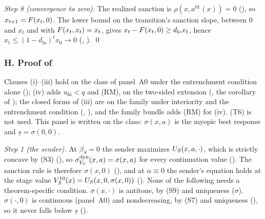 \emph{Step 8 (convergence to zero).} The realized sanction is $\rho(x,a^{01}(x))=0$
(), so $x_{t+1}=F(x_t,0)$. The lower bound on the
transition's sanction slope, between $0$ and $x_t$ and with $F(x_t,x_t)=x_t$, gives
$x_t-F(x_t,0)\ge d_{\mathrm{lo}}x_t$, hence $x_t\le(1-d_{\mathrm{lo}})^tx_0\to0$
(, ). \qed

\subsubsection*{H. Proof of }

Clauses (i)--(iii) hold on the class of panel~A0 under the entrenchment condition alone
(); (iv) adds $u_{\mathrm{hi}}<q$ and
(RM), on the two-sided extension (, the
corollary of ); the
closed forms of (iii) are on the family under interiority and the entrenchment condition
(,
), and the family bundle
 adds (RM) for (iv). (T6) is not used. This panel is written
on the class: $\sigma(x,a)$ is the myopic best response and $\underline s=\sigma(0,0)$.

\emph{Step 1 (the sender).} At $\beta_S=0$ the sender maximizes $U_S(x,a,\cdot)$,
which is strictly concave by (S3) (), so
$\sigma^{\mathrm{dyn}}_{V_S}(x,a)=\sigma(x,a)$ for every continuation value
(). The sanction rule is
therefore $\sigma(x,0)$ (), and at
$\alpha\equiv0$ the sender's equation holds at the stage value
$V_S^{10}(x)=U_S(x,0,\sigma(x,0))$ (). None of the following needs a
theorem-specific condition. $\sigma(x,\cdot)$ is antitone, by (S9) and uniqueness
($\sigma$). $\sigma(\cdot,0)$ is continuous
(panel~A0) and nondecreasing, by (S7) and uniqueness (),
so it never falls below $\underline s$ ().

